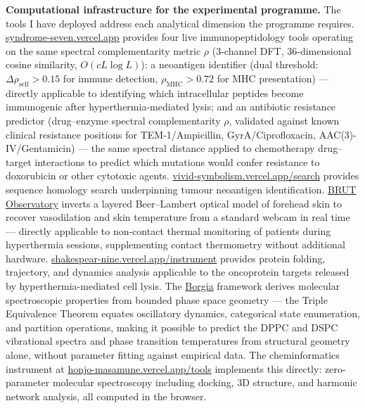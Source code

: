 \documentclass[12pt,a4paper]{article}
\begin{document}
\textbf{Computational infrastructure for the experimental programme.}
The tools I have deployed address each analytical dimension the programme requires.
\href{https://syndrome-seven.vercel.app}{syndrome-seven.vercel.app} provides
four live immunopeptidology tools operating on the same spectral complementarity
metric $\rho$ (3-channel DFT, 36-dimensional cosine similarity, $O(cL\log L)$):
a neoantigen identifier (dual threshold: $\Delta\rho_\text{self} > 0.15$ for
immune detection, $\rho_\text{MHC} > 0.72$ for MHC presentation) --- directly
applicable to identifying which intracellular peptides become immunogenic after
hyperthermia-mediated lysis; and an antibiotic resistance predictor
(drug--enzyme spectral complementarity $\rho$, validated against known clinical
resistance positions for TEM-1/Ampicillin, GyrA/Ciprofloxacin,
AAC(3)-IV/Gentamicin) --- the same spectral distance applied to chemotherapy
drug--target interactions to predict which mutations would confer resistance
to doxorubicin or other cytotoxic agents.
\href{https://vivid-symbolism.vercel.app/search}{vivid-symbolism.vercel.app/search}
provides sequence homology search underpinning tumour neoantigen identification.
\href{https://remote-photoplethysmography.vercel.app/}{BRUT Observatory} inverts
a layered Beer--Lambert optical model of forehead skin to recover vasodilation
and skin temperature from a standard webcam in real time --- directly applicable
to non-contact thermal monitoring of patients during hyperthermia sessions,
supplementing contact thermometry without additional hardware.
\href{https://shakespear-nine.vercel.app/instrument}{shakespear-nine.vercel.app/instrument}
provides protein folding, trajectory, and dynamics analysis applicable to the
oncoprotein targets released by hyperthermia-mediated cell lysis.
The \href{https://github.com/fullscreen-triangle/borgia}{Borgia} framework
derives molecular spectroscopic properties from bounded phase space geometry ---
the Triple Equivalence Theorem equates oscillatory dynamics, categorical state
enumeration, and partition operations, making it possible to predict the DPPC
and DSPC vibrational spectra and phase transition temperatures from structural
geometry alone, without parameter fitting against empirical data.
The cheminformatics instrument at
\href{https://honjo-masamune.vercel.app/tools}{honjo-masamune.vercel.app/tools}
implements this directly: zero-parameter molecular spectroscopy including docking,
3D structure, and harmonic network analysis, all computed in the browser.
\end{document}
